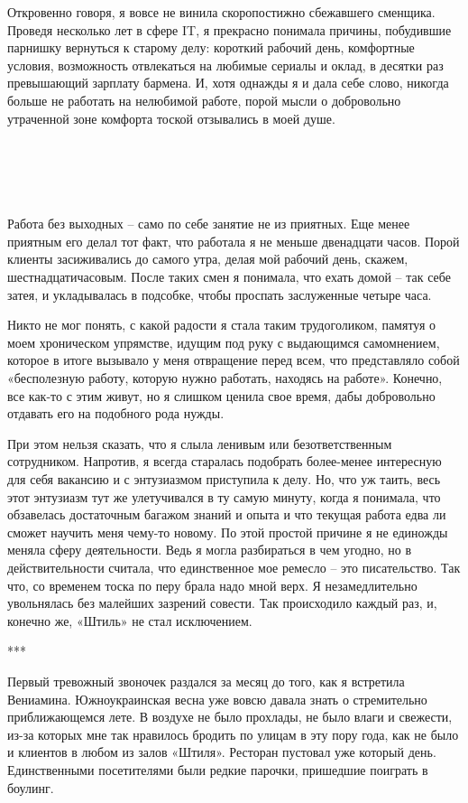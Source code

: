 \documentclass[
]{book}
\begin{document}
Откровенно говоря, я вовсе не винила скоропостижно сбежавшего сменщика. Проведя несколько лет в сфере IT, я прекрасно понимала причины, побудившие парнишку вернуться к старому делу: короткий рабочий день, комфортные условия, возможность отвлекаться на любимые сериалы и оклад, в десятки раз превышающий зарплату бармена. И, хотя однажды я и дала себе слово, никогда больше не работать на нелюбимой работе, порой мысли о добровольно утраченной зоне комфорта тоской отзывались в моей душе.

\hypertarget{chapter-32}{%
\chapter{~}\label{chapter-32}}

Работа без выходных -- само по себе занятие не из приятных. Еще менее приятным его делал тот факт, что работала я не меньше двенадцати часов. Порой клиенты засиживались до самого утра, делая мой рабочий день, скажем, шестнадцатичасовым. После таких смен я понимала, что ехать домой -- так себе затея, и укладывалась в подсобке, чтобы проспать заслуженные четыре часа.

Никто не мог понять, с какой радости я стала таким трудоголиком, памятуя о моем хроническом упрямстве, идущим под руку с выдающимся самомнением, которое в итоге вызывало у меня отвращение перед всем, что представляло собой «бесполезную работу, которую нужно работать, находясь на работе». Конечно, все как-то с этим живут, но я слишком ценила свое время, дабы добровольно отдавать его на подобного рода нужды.

При этом нельзя сказать, что я слыла ленивым или безответственным сотрудником. Напротив, я всегда старалась подобрать более-менее интересную для себя вакансию и с энтузиазмом приступила к делу. Но, что уж таить, весь этот энтузиазм тут же улетучивался в ту самую минуту, когда я понимала, что обзавелась достаточным багажом знаний и опыта и что текущая работа едва ли сможет научить меня чему-то новому. По этой простой причине я не единожды меняла сферу деятельности. Ведь я могла разбираться в чем угодно, но в действительности считала, что единственное мое ремесло -- это писательство. Так что, со временем тоска по перу брала надо мной верх. Я незамедлительно увольнялась без малейших зазрений совести. Так происходило каждый раз, и, конечно же, «Штиль» не стал исключением.

***

Первый тревожный звоночек раздался за месяц до того, как я встретила Вениамина. Южноукраинская весна уже вовсю давала знать о стремительно приближающемся лете. В воздухе не было прохлады, не было влаги и свежести, из-за которых мне так нравилось бродить по улицам в эту пору года, как не было и клиентов в любом из залов «Штиля». Ресторан пустовал уже который день. Единственными посетителями были редкие парочки, пришедшие поиграть в боулинг.
\end{document}
